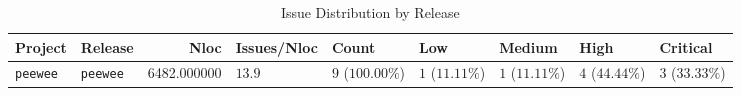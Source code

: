 \begin{table}
\caption{Issue Distribution by Release}
\label{tab:issue-release-distribution}
\begin{tabular}{llrllllll}
\toprule
Project & Release & Nloc & Issues/Nloc & Count & Low & Medium & High & Critical \\
\midrule
\texttt{peewee} & \texttt{peewee} & 6482.000000 & $13.9$ & $9$ ($100.00\%$) & $1$ ($11.11\%$) & $1$ ($11.11\%$) & $4$ ($44.44\%$) & $3$ ($33.33\%$) \\
\bottomrule
\end{tabular}
\end{table}
